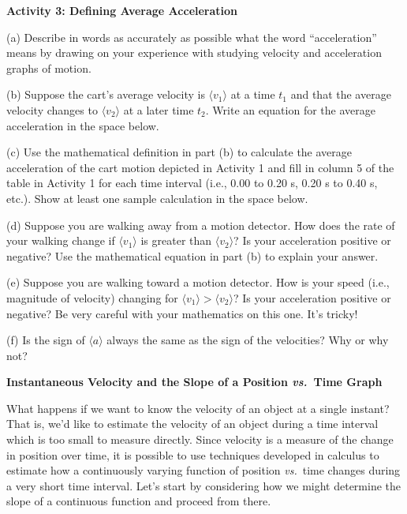\textbf{Activity 3: Defining Average Acceleration }

(a) Describe in words as accurately as possible what the word ``acceleration''
means by drawing on your experience with studying velocity and acceleration
graphs of motion.
\answerspace{20mm}

(b) Suppose the cart's average velocity is $\langle v_{1}\rangle$
at a time \( t_{1} \)
and that the average velocity changes to $\langle v_2\rangle$
at a later time \( t_{2} \).
Write an equation for the average acceleration in the space below. 
\answerspace{20mm}

\pagebreak[2]
(c) Use the mathematical definition in part (b) to calculate the average acceleration
of the cart motion depicted in Activity 1 and fill in column 5 of the table
in Activity 1 for each time interval (i.e., 0.00 to 0.20 s, 0.20 s to 0.40 s,
etc.). Show at least one sample calculation in the space below.
\answerspace{20mm}

(d) Suppose you are walking away from a motion detector. How does the rate of
your walking change if $\langle v_{1}\rangle$ is greater than 
$\langle v_{2}\rangle$? Is your
acceleration positive or negative? Use the mathematical equation in part (b)
to explain your answer. 
\vspace{20mm}

(e) Suppose you are walking toward a motion detector. How is your speed (i.e.,
magnitude of velocity) changing for 
$\langle v_{1}\rangle > \langle v_{2} \rangle$? Is your
acceleration positive or negative? Be very careful with your mathematics on
this one. It's tricky!
\vspace{20mm}

(f) Is the sign of $\langle a\rangle$
always the same as the sign of the velocities? Why or
why not?
\vspace{20mm}

\textbf{Instantaneous Velocity and the Slope of a Position \textit{vs.}~Time Graph} 

What happens if we want to know the velocity of an object at a single instant?
That is, we'd like to estimate the velocity of an object during a time interval
which is too small to measure directly. Since velocity is a measure of the change
in position over time, it is possible to use techniques developed in calculus
to estimate how a continuously varying function of position \textit{vs.}~time changes
during a very short time interval. Let's start by considering how we might determine
the slope of a continuous function and proceed from there.

